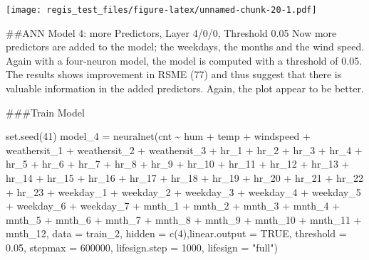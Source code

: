\documentclass[
]{article}
\newenvironment{Shaded}{\begin{snugshade}}{\end{snugshade}}
\newcommand{\AttributeTok}[1]{\textcolor[rgb]{0.77,0.63,0.00}{#1}}
\newcommand{\ConstantTok}[1]{\textcolor[rgb]{0.00,0.00,0.00}{#1}}
\newcommand{\DecValTok}[1]{\textcolor[rgb]{0.00,0.00,0.81}{#1}}
\newcommand{\FloatTok}[1]{\textcolor[rgb]{0.00,0.00,0.81}{#1}}
\newcommand{\FunctionTok}[1]{\textcolor[rgb]{0.00,0.00,0.00}{#1}}
\newcommand{\NormalTok}[1]{#1}
\newcommand{\OtherTok}[1]{\textcolor[rgb]{0.56,0.35,0.01}{#1}}
\newcommand{\SpecialCharTok}[1]{\textcolor[rgb]{0.00,0.00,0.00}{#1}}
\newcommand{\StringTok}[1]{\textcolor[rgb]{0.31,0.60,0.02}{#1}}
\begin{document}
\texttt{[image: regis\_test\_files/figure-latex/unnamed-chunk-20-1.pdf]}

\#\#ANN Model 4: more Predictors, Layer 4/0/0, Threshold 0.05 Now more
predictors are added to the model; the weekdays, the months and the wind
speed. Again with a four-neuron model, the model is computed with a
threshold of 0.05. The results shows improvement in RSME (77) and thus
suggest that there is valuable information in the added predictors.
Again, the plot appear to be better.

\#\#\#Train Model

\begin{Shaded}
\begin{Highlighting}[]
\FunctionTok{set.seed}\NormalTok{(}\DecValTok{41}\NormalTok{)}
\NormalTok{model\_4 }\OtherTok{=} \FunctionTok{neuralnet}\NormalTok{(cnt }\SpecialCharTok{\textasciitilde{}}\NormalTok{ hum }\SpecialCharTok{+}\NormalTok{ temp }\SpecialCharTok{+}\NormalTok{ windspeed }\SpecialCharTok{+}\NormalTok{ weathersit\_1 }\SpecialCharTok{+}\NormalTok{ weathersit\_2 }\SpecialCharTok{+}\NormalTok{ weathersit\_3 }\SpecialCharTok{+}\NormalTok{ hr\_1 }\SpecialCharTok{+}\NormalTok{ hr\_2 }\SpecialCharTok{+}\NormalTok{ hr\_3 }\SpecialCharTok{+}\NormalTok{ hr\_4 }\SpecialCharTok{+}\NormalTok{ hr\_5 }\SpecialCharTok{+}\NormalTok{ hr\_6 }\SpecialCharTok{+}\NormalTok{ hr\_7 }\SpecialCharTok{+}\NormalTok{ hr\_8 }\SpecialCharTok{+}\NormalTok{ hr\_9 }\SpecialCharTok{+}\NormalTok{ hr\_10 }\SpecialCharTok{+}\NormalTok{ hr\_11 }\SpecialCharTok{+}\NormalTok{ hr\_12 }\SpecialCharTok{+}\NormalTok{ hr\_13 }\SpecialCharTok{+}\NormalTok{ hr\_14 }\SpecialCharTok{+}\NormalTok{ hr\_15 }\SpecialCharTok{+}\NormalTok{ hr\_16 }\SpecialCharTok{+}\NormalTok{ hr\_17 }\SpecialCharTok{+}\NormalTok{ hr\_18 }\SpecialCharTok{+}\NormalTok{ hr\_19 }\SpecialCharTok{+}\NormalTok{ hr\_20 }\SpecialCharTok{+}\NormalTok{ hr\_21 }\SpecialCharTok{+}\NormalTok{ hr\_22 }\SpecialCharTok{+}\NormalTok{ hr\_23 }\SpecialCharTok{+}\NormalTok{ weekday\_1 }\SpecialCharTok{+}\NormalTok{ weekday\_2 }\SpecialCharTok{+}\NormalTok{ weekday\_3 }\SpecialCharTok{+}\NormalTok{ weekday\_4 }\SpecialCharTok{+}\NormalTok{ weekday\_5 }\SpecialCharTok{+}\NormalTok{ weekday\_6 }\SpecialCharTok{+}\NormalTok{ weekday\_7 }\SpecialCharTok{+}\NormalTok{ mnth\_1 }\SpecialCharTok{+}\NormalTok{ mnth\_2 }\SpecialCharTok{+}\NormalTok{ mnth\_3 }\SpecialCharTok{+}\NormalTok{ mnth\_4 }\SpecialCharTok{+}\NormalTok{ mnth\_5 }\SpecialCharTok{+}\NormalTok{ mnth\_6 }\SpecialCharTok{+}\NormalTok{ mnth\_7 }\SpecialCharTok{+}\NormalTok{ mnth\_8 }\SpecialCharTok{+}\NormalTok{ mnth\_9 }\SpecialCharTok{+}\NormalTok{ mnth\_10 }\SpecialCharTok{+}\NormalTok{ mnth\_11 }\SpecialCharTok{+}\NormalTok{ mnth\_12, }\AttributeTok{data =}\NormalTok{ train\_2, }\AttributeTok{hidden =} \FunctionTok{c}\NormalTok{(}\DecValTok{4}\NormalTok{),}\AttributeTok{linear.output =} \ConstantTok{TRUE}\NormalTok{, }\AttributeTok{threshold =} \FloatTok{0.05}\NormalTok{, }\AttributeTok{stepmax =} \DecValTok{600000}\NormalTok{, }\AttributeTok{lifesign.step =} \DecValTok{1000}\NormalTok{, }\AttributeTok{lifesign =} \StringTok{"full"}\NormalTok{)}
\end{Highlighting}
\end{Shaded}
\end{document}
